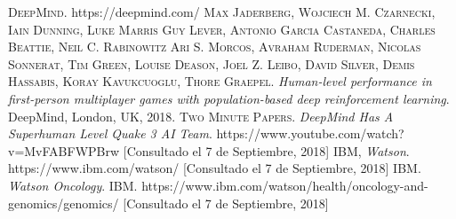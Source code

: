 \documentclass{article}
\begin{document}
\begin{thebibliography}{99}
	 \textsc{DeepMind}. https://deepmind.com/
	\textsc{Max Jaderberg, Wojciech M. Czarnecki, Iain Dunning, Luke Marris Guy Lever, Antonio Garcia Castaneda, Charles Beattie, Neil C. Rabinowitz Ari S. Morcos, Avraham Ruderman, Nicolas Sonnerat, Tim Green, Louise Deason, Joel Z. Leibo, David Silver, Demis Hassabis, Koray Kavukcuoglu, Thore Graepel}. \textit{Human-level performance in first-person multiplayer games with population-based deep reinforcement learning}. DeepMind, London, UK, 2018.
	\textsc{Two Minute Papers}. \textit{DeepMind Has A Superhuman Level Quake 3 AI Team}. https://www.youtube.com/watch?v=MvFABFWPBrw [Consultado el 7 de Septiembre, 2018]
	\textsc{IBM}, \textit{Watson}. https://www.ibm.com/watson/ [Consultado el 7 de Septiembre, 2018]
	\textsc{IBM}. \textit{Watson Oncology}. IBM. https://www.ibm.com/watson/health/oncology-and-genomics/genomics/ [Consultado el 7 de Septiembre, 2018]

\end{thebibliography}
\end{document}
